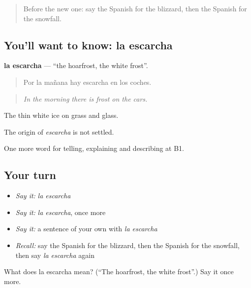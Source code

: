 \label{lesson:ES-C700-escarcha}



\begin{quote}
Before the new one: say the Spanish for the blizzard, then the Spanish for the snowfall.
\end{quote}

\subsection*{You'll want to know: la escarcha}
\textbf{la escarcha} — \textquotedblleft{}the hoarfrost, the white frost\textquotedblright{}.

\begin{quote}
Por la mañana hay escarcha en los coches.
\end{quote}

\begin{quote}
\emph{In the morning there is frost on the cars.}
\end{quote}

The thin white ice on grass and glass.

\begin{cousinweb}
The origin of \emph{escarcha} is not settled.
\end{cousinweb}

\begin{grammarlens}[title={What you've built}]
One more word for telling, explaining and describing at B1.
\end{grammarlens}

\subsection*{Your turn}
\begin{itemize}
\raggedright
  \item \emph{Say it:} \emph{la escarcha}
  \item \emph{Say it:} \emph{la escarcha}, once more
  \item \emph{Say it:} a sentence of your own with \emph{la escarcha}
  \item \emph{Recall:} say the Spanish for the blizzard, then the Spanish for the snowfall, then say \emph{la escarcha} again
\end{itemize}

\begin{tcolorbox}[breakable,colback=teal!4,colframe=teal!35!black,title={Before you move on}]
What does la escarcha mean? (\textquotedblleft{}The hoarfrost, the white frost\textquotedblright{}.) Say it once more.
\end{tcolorbox}
